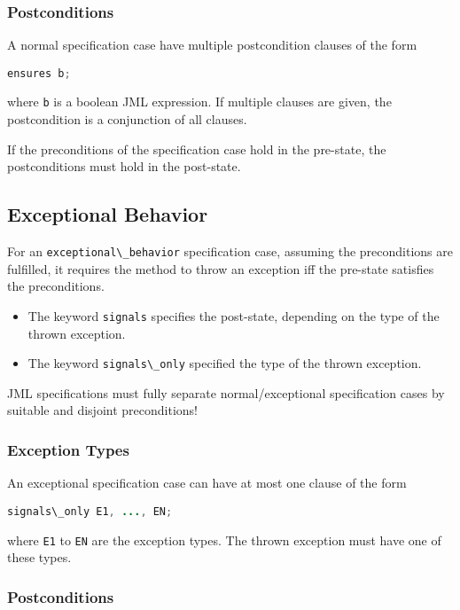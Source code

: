 \documentclass[a4paper, 11pt, accentcolor = tud3b]{tudreport}
\newcommand{\inlineJava}[1]{\lstinline[language = Java]|#1|}
\begin{document}
				\subsubsection{Postconditions}
					\label{sec:postcond1}
				
					A normal specification case have multiple postcondition clauses of the form
					\begin{center}
						\inlineJava{ensures b;}
					\end{center}
					where \texttt{b} is a boolean JML expression. If multiple clauses are given, the postcondition is a conjunction of all clauses.
					
					If the preconditions of the specification case hold in the pre-state, the postconditions must hold in the post-state.

			\subsection{Exceptional Behavior}
				For an \inlineJava{exceptional\_behavior} specification case, assuming the preconditions are fulfilled, it requires the method to throw an exception iff the pre-state satisfies the preconditions.
				\begin{itemize}
					\item The keyword \inlineJava{signals} specifies the post-state, depending on the type of the thrown exception.
					\item The keyword \inlineJava{signals\_only} specified the type of the thrown exception.
				\end{itemize}
				JML specifications must fully separate normal/exceptional specification cases by suitable and disjoint preconditions!

				\subsubsection{Exception Types}
					An exceptional specification case can have at most one clause of the form
					\begin{center}
						\inlineJava{signals\_only E1, ..., EN;}
					\end{center}
					where \texttt{E1} to \texttt{EN} are the exception types. The thrown exception must have one of these types.

				\subsubsection{Postconditions}
					\label{sec:postcond2}
				
\end{document}
